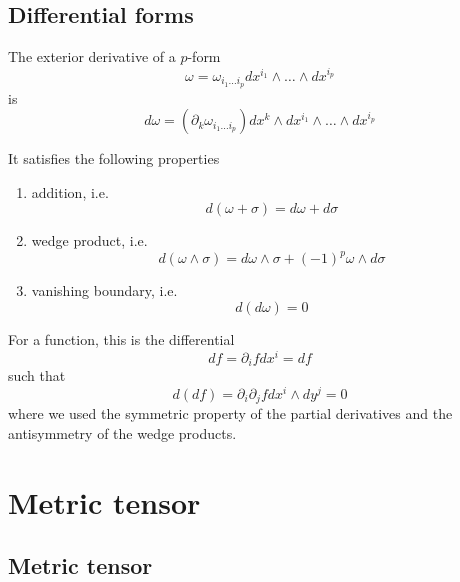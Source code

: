 \section{Differential forms}

    The exterior derivative of a $p$-form
    \begin{equation*}
        \omega = \omega_{i_1 \ldots i_p} dx^{i_1} \wedge \ldots \wedge dx^{i_p}
    \end{equation*}
    is 
    \begin{equation*}
        d \omega = (\partial_k \omega_{i_1 \ldots i_p}) dx^k \wedge dx^{i_1} \wedge \ldots \wedge dx^{i_p}
    \end{equation*}

    It satisfies the following properties 
    \begin{enumerate}
        \item addition, i.e.
            \begin{equation*}
                d(\omega + \sigma) = d\omega + d\sigma
            \end{equation*}
        \item wedge product, i.e.
            \begin{equation*}
                d(\omega \wedge \sigma) = d\omega \wedge \sigma + (-1)^p \omega \wedge d\sigma
            \end{equation*}
        \item vanishing boundary, i.e.
            \begin{equation*}
                d (d\omega) = 0
            \end{equation*}
    \end{enumerate}

    For a function, this is the differential 
    \begin{equation*}
        df = \partial_i f dx^i = df
    \end{equation*}
    such that 
    \begin{equation*}
        d(df) = \partial_i \partial_j f dx^i \wedge dy^j = 0
    \end{equation*}
    where we used the symmetric property of the partial derivatives and the antisymmetry of the wedge products.

\chapter{Metric tensor}

\section{Metric tensor}

